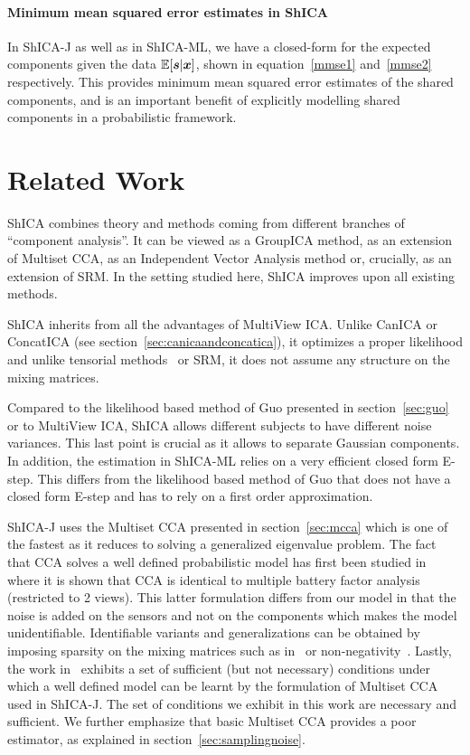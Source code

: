 \paragraph{Minimum mean squared error estimates in ShICA}
In ShICA-J as well as in ShICA-ML, we have a closed-form for the expected components given the data $\mathbb{E}[\boldsymbol{s} | \boldsymbol{x}]$, shown in equation~\eqref{mmse1} and~\eqref{mmse2} respectively. This provides minimum mean squared error estimates of the shared components, and is an important benefit of explicitly modelling shared components in a probabilistic framework.
\section{Related Work}
ShICA combines theory and methods coming from different branches of ``component analysis''. It can be viewed as a GroupICA method, as an extension of Multiset CCA, as an Independent Vector Analysis method or, crucially, as an extension of SRM. In the setting studied here, ShICA improves upon all existing methods.

ShICA inherits from all the advantages of MultiView ICA. Unlike CanICA or ConcatICA
(see section~\ref{sec:canicaandconcatica}), it optimizes a
proper likelihood and unlike tensorial
methods~\cite{beckmann2005tensorial} or SRM, it does not assume any structure on
the mixing matrices.

Compared to the likelihood based method of Guo presented in section~\ref{sec:guo} or to MultiView ICA, ShICA allows different subjects to have different noise
variances. This last point is crucial as it allows to separate Gaussian components. In addition, the estimation in ShICA-ML relies on a very efficient closed form
E-step. This differs from the likelihood based method of Guo that does not have
a closed form E-step and has to rely on a first order approximation.

ShICA-J uses the Multiset CCA presented in section~\ref{sec:mcca} which is one of the fastest as it reduces to solving a generalized eigenvalue problem. The fact that CCA solves a well defined probabilistic model has first been studied in~\cite{bach2005probabilistic} where it is shown that CCA is identical to multiple battery factor analysis~\cite{browne1980factor} (restricted to 2 views). This latter formulation differs from our model in that the noise is added on the sensors and not on the components which makes the model unidentifiable. Identifiable variants and
generalizations can be obtained by imposing sparsity on the mixing matrices such as in~\cite{archambeau2008sparse, klami2014group, witten2009extensions} or non-negativity~\cite{DELEUS2011143}.
Lastly, the work in~\cite{li2009joint} exhibits a set of sufficient (but not necessary) conditions under which a well defined model can be learnt by the formulation of Multiset CCA used in ShICA-J. The set of conditions we exhibit in this work are necessary and sufficient. We further emphasize that basic Multiset CCA provides a poor estimator, as explained in section~\ref{sec:samplingnoise}.

